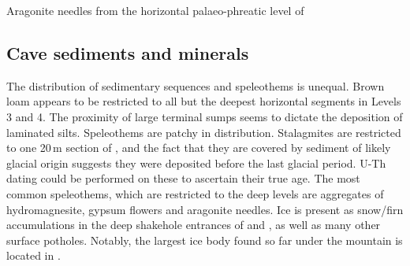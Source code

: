 \begin{marginfigure}
\caption{Aragonite needles from the horizontal palaeo-phreatic level of  }\label{fig:aragonite_needles}
\end{marginfigure}


\subsection{Cave sediments and minerals}
The distribution of sedimentary sequences and speleothems is unequal. Brown loam appears to be restricted to all but the deepest horizontal segments in Levels 3 and 4.
The proximity of large terminal sumps seems to dictate the deposition of laminated silts. 
Speleothems are patchy in distribution. Stalagmites are restricted to one 20\,m section of , and the fact that they are covered by sediment of likely glacial origin suggests they were deposited before the last glacial period. U-Th dating could be performed on these to ascertain their true age.
The most common speleothems, which are restricted to the deep levels are aggregates of hydromagnesite, gypsum flowers and aragonite needles.
Ice is present as snow/firn accumulations in the deep shakehole entrances of  and , as well as many other surface potholes.
Notably, the largest ice body found so far under the mountain is located in .

